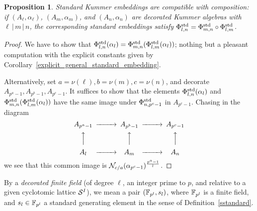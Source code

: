 \documentclass[sigconf]{acmart}
\newtheorem{proposition}[theorem]{Proposition}
\begin{document}
\begin{proposition}
\label{standard_K_embeddings_compatibles}
Standard Kummer embeddings are compatible with composition:
if $(A_\ell,\alpha_\ell)$, $(A_m,\alpha_m)$, and $(A_n,\alpha_n)$ are decorated Kummer algebras
with $\ell\,|\,m\,|\,n$, the corresponding standard embeddings
satisfy ${\Phi^{\mathrm{std}}_{{l},{n}}}={\Phi^{\mathrm{std}}_{{m},{n}}}\circ{\Phi^{\mathrm{std}}_{{l},{m}}}$.
\end{proposition}
\begin{proof}
We have to show that ${\Phi^{\mathrm{std}}_{{l},{n}}}(\alpha_l)={\Phi^{\mathrm{std}}_{{m},{n}}}({\Phi^{\mathrm{std}}_{{l},{m}}}(\alpha_l))$;
nothing but a pleasant computation with the explicit constants given 
by Corollary~\ref{explicit_general_standard_embedding}.

Alternatively, set $a=\nu(\ell),b=\nu(m),c=\nu(n)$, and decorate $A_{p^a-1},A_{p^b-1},A_{p^c-1}$.
It suffices to show that the elements ${\Phi^{\mathrm{std}}_{{l},{n}}}(\alpha_l)$
and ${\Phi^{\mathrm{std}}_{{m},{n}}}({\Phi^{\mathrm{std}}_{{l},{m}}}(\alpha_l))$ have the same image under ${\Phi^{\mathrm{std}}_{{n},{p^c-1}}}$
in $A_{p^c-1}$.
Chasing in the diagram
\begin{equation*}
\begin{CD}
A_{p^a-1} @>>> A_{p^b-1} @>>> A_{p^c-1} \\
@AAA @AAA @AAA\\
A_\ell @>>> A_m @>>> A_n
\end{CD}
\end{equation*}
we see that this common image
is $\mathcal{N}_{c/a}(\alpha_{p^c-1})^{\frac{p^a-1}{l}}$.
\end{proof}

By a \emph{decorated finite field} (of degree $\ell$, an integer prime to $p$,
and relative to a given cyclotomic lattice $\mathcal{S}^{I}$),
we mean a pair $(\mathbb{F}_{p^l},s_l)$,
where $\mathbb{F}_{p^l}$ is a finite field,
and $s_l\in\mathbb{F}_{p^l}$ a standard generating element
in the sense of Definition~\ref{sstandard}.
\end{document}
